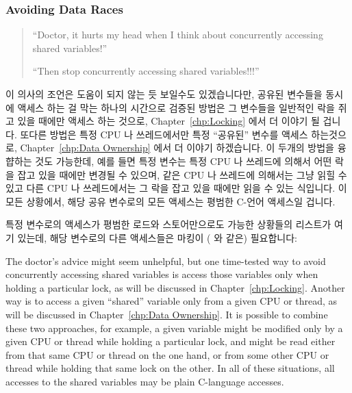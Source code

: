 \subsubsection{Avoiding Data Races}
\label{sec:toolsoftrade:Avoiding Data Races}

\begin{quote}
``Doctor, it hurts my head when I think about concurrently accessing
shared variables!''

``Then stop concurrently accessing shared variables!!!''
\end{quote}

이 의사의 조언은 도움이 되지 않는 듯 보일수도 있겠습니다만, 공유된 변수들을
동시에 액세스 하는 걸 막는 하나의 시간으로 검증된 방법은 그 변수들을 일반적인
락을 쥐고 있을 때에만 액세스 하는 것으로,
Chapter~\ref{chp:Locking} 에서 더 이야기 될 겁니다.
또다른 방법은 특정 CPU 나 쓰레드에서만 특정 ``공유된'' 변수를 액세스
하는것으로,
Chapter~\ref{chp:Data Ownership} 에서 더 이야기 하겠습니다.
이 두개의 방법을 융햡하는 것도 가능한데, 예를 들면 특정 변수는 특정 CPU 나
쓰레드에 의해서 어떤 락을 잡고 있을 때에만 변경될 수 있으며, 같은 CPU 나
쓰레드에 의해서는 그냥 읽힐 수 있고 다른 CPU 나 쓰레드에서는 그 락을 잡고 있을
때에만 읽을 수 있는 식입니다.
이 모든 상황에서, 해당 공유 변수로의 모든 액세스는 평범한 C-언어 액세스일
겁니다.

특정 변수로의 액세스가 평범한 로드와 스토어만으로도 가능한 상황들의 리스트가
여기 있는데, 해당 변수로의 다른 액세스들은 마킹이 ( 와
 같은) 필요합니다:

\iffalse

The doctor's advice might seem unhelpful, but
one time-tested way to avoid concurrently accessing shared variables
is access those variables only when holding a particular lock, as will
be discussed in Chapter~\ref{chp:Locking}.
Another way is to access a given ``shared'' variable only from a given
CPU or thread, as will be discussed in
Chapter~\ref{chp:Data Ownership}.
It is possible to combine these two approaches, for example, a given
variable might be modified only by a given CPU or thread while holding a
particular lock, and might be read either from that same CPU or thread
on the one hand, or from some other CPU or thread while holding that
same lock on the other.
In all of these situations, all accesses to the shared variables may
be plain C-language accesses.

